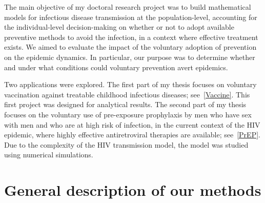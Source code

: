 The main objective of my doctoral research project was to build mathematical models for infectious disease transmission at the population-level, accounting for the individual-level decision-making on whether or not to adopt available preventive methods to avoid the infection, in a context where effective treatment exists. We aimed to evaluate the impact of the voluntary adoption of prevention on the epidemic dynamics. In particular, our purpose was to determine whether and under what conditions could voluntary prevention avert epidemics.

Two applications were explored. The first part of my thesis focuses on voluntary vaccination against treatable childhood infectious diseases; see~\autoref{Vaccine}. This first project was designed for analytical results. The second part of my thesis focuses on the voluntary use of pre-exposure prophylaxis by men who have sex with men and who are at high risk of infection, in the current context of the HIV epidemic, where highly effective antiretroviral therapies are available; see~\autoref{PrEP}. Due to the complexity of the HIV transmission model, the model was studied using numerical simulations.



\section{General description of our methods}

